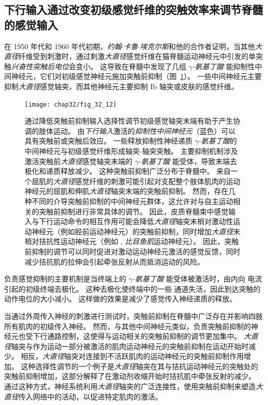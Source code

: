\subsection{下行输入通过改变初级感觉纤维的突触效率来调节脊髓的感觉输入}

在 1950 年代和 1960 年代初期，\textit{约翰$\cdot$卡鲁$\cdot$埃克尔斯}和他的合作者证明，当其他\textit{大直径}纤维受到刺激时，通过刺激\textit{大直径}感觉纤维在猫脊髓运动神经元中引发的单突触\textit{兴奋性突触后电位}会变小。
这导致在脊髓中发现了几组 \textit{$\gamma$-氨基丁酸} 能抑制性中间神经元，它们对初级感觉神经元施加突触前抑制（图~\ref{fig:32_12}）。 
一些中间神经元主要抑制\textit{大直径}感觉轴突，而其他神经元主要抑制 Ib 轴突或皮肤的感觉纤维。


\begin{figure}[htbp]
	\centering
	\texttt{[image: chap32/fig\_32\_12]}
	\caption{通过降低突触前抑制输入选择性调节初级感觉轴突末端有助于产生协调的肢体运动。
		由\textit{下行输入}激活的\textit{抑制性中间神经元}（蓝色）可以具有突触前或突触后效应。
		一些释放抑制性神经递质 \textit{$ \gamma $-氨基丁酸}的中间神经元与初级感觉纤维形成轴突-轴突突触。
		主要抑制机制涉及激活突触前\textit{大直径}感觉轴突末端的 \textit{$ \gamma $-氨基丁酸} 能受体，导致末端去极化和递质释放减少。
		这种突触前抑制广泛分布于脊髓中。
		来自一个屈肌的\textit{大直径}感觉纤维的刺激可能引起对支配整个肢体肌肉的运动神经元的屈肌和伸肌\textit{大直径}轴突末端的突触前抑制。
		然而，存在几种不同的介导突触前抑制的中间神经元群体，这允许对与自主运动相关的突触前抑制进行非常具体的调节。
		因此，皮质脊髓束中感觉输入与下行运动命令的相互作用可能会降低\textit{大直径}轴突末梢对激动性运动神经元（例如胫前运动神经元）的突触前抑制，同时增加\textit{大直径}末梢对拮抗性运动神经元（例如 , \textit{比目鱼肌}运动神经元）。
		因此，突触前抑制的调节可以同时促进对激动运动神经元激活的感觉反馈，同时减少拮抗肌的拉伸会引起牵张反射从而抵消运动的风险。}
	\label{fig:32_12}
\end{figure}


负责感觉抑制的主要机制是当终端上的 \textit{$ \gamma $-氨基丁酸} 能受体被激活时，由内向  电流引起的初级终端去极化。
这种去极化使终端中的一些  通道失活，因此到达突触的动作电位的大小减小。
这样做的效果是减少了感觉传入神经递质的释放。


当通过外周传入神经的刺激进行测试时，突触前抑制在脊髓中广泛存在并影响四肢所有肌肉的初级传入神经。
然而，与其他中间神经元类似，负责突触前抑制的神经元也受下行通路控制，这使得与运动相关的突触前抑制的调节更加集中。
\textit{大直径}轴突与作为运动一部分被激活的肌肉运动神经元的突触前抑制在运动开始时减少。
相反，\textit{大直径}轴突对连接到不活跃肌肉的运动神经元的突触前抑制作用增加。
这种选择性调节的一个例子是\textit{大直径}轴突在其与拮抗运动神经元的突触处的突触前抑制增加，这部分解释了在激动剂收缩开始时拮抗肌中牵张反射的减少。
通过这种方式，神经系统利用\textit{大直径}轴突的广泛连接性，使用突触前抑制来塑造\textit{大直径}传入网络中的活动，以促进特定肌肉的激活。


